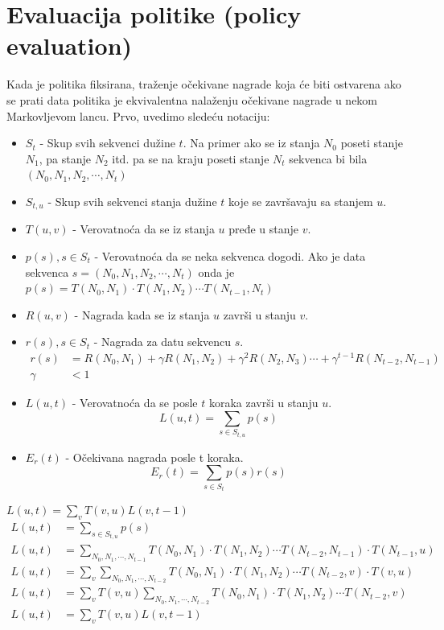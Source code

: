\documentclass[a4paper,fleqn,12pt]{JMThesis}
\newcommand{\latin}{\fontencoding{T1}\selectfont\selectlanguage{english}}
\theoremstyle{plain}
\theoremstyle{definition}
\theoremstyle{definition}
\begin{document}
\section{Evaluacija politike ({\latin policy evaluation})}
Kada je politika fiksirana, traženje očekivane nagrade koja će biti ostvarena ako se prati data politika je ekvivalentna nalaženju očekivane nagrade u nekom Markovljevom lancu. Prvo, uvedimo sledeću notaciju:
\begin{itemize}
	\item $S_t$ - Skup svih sekvenci dužine $t$. Na primer ako se iz stanja $N_0$ poseti stanje $N_1$, pa stanje $N_2$ itd. pa se na kraju poseti stanje $N_t$ sekvenca bi bila $(N_0, N_1, N_2, \cdots , N_t)$
 	\item $S_{t,u}$ - Skup svih sekvenci stanja dužine $t$ koje se završavaju sa stanjem $u$.
  	\item $T(u,v)$ - Verovatnoća da se iz stanja $u$ pređe u stanje $v$.
   	\item $p(s), s \in S_t$ - Verovatnoća da se neka sekvenca dogodi. Ako je data sekvenca $s=(N_0,N_1,N_2,\cdots , N_t)$ onda je $p(s) = T(N_0, N_1)\cdot T(N_1,N_2)\cdots T(N_{t-1},N_{t})$
    \item $R(u,v)$ - Nagrada kada se iz stanja $u$ završi u stanju $v$.
    \item $r(s), s \in S_t$ - Nagrada za datu sekvencu $s$. 
    \[ 
		\begin{split}
		r(s) &= R(N_0, N_1)+\gamma R(N_1,N_2) +\gamma^2 R(N_2,N_3) \cdots + \gamma^{t-1} R(N_{t-2},N_{t-1}) \\
		\gamma &< 1
		\end{split}
	\]
    \item $L(u,t)$ - Verovatnoća da se posle $t$ koraka završi u stanju $u$. 
	\[ 
		L(u,t) = \sum_{s \in S_{t,u}}p(s)
	\]
    \item $E_r(t)$ - Očekivana nagrada posle t koraka.
    \[
		E_r(t) = \sum_{s \in S_t}p(s)r(s)
	\]
\end{itemize}
\lem $L(u,t) = \sum_{v}T(v,u)L(v,t-1)$
\[
\begin{split}
	L(u,t) &= \sum_{s \in S_{t,u}}p(s)	\\
	L(u,t) &= \sum_{N_0, N_1, \cdots, N_{t-1}}T(N_0,N_1)\cdot T(N_1,N_2)\cdots T(N_{t-2},N_{t-1})\cdot T(N_{t-1},u)\\
	L(u,t) &= \sum_{v}\sum_{N_0, N_1,\cdots , N_{t-2}}T(N_0,N_1)\cdot T(N_1,N_2)\cdots T(N_{t-2},v) \cdot T(v,u)\\
	L(u,t) &= \sum_{v}T(v,u)\sum_{N_0, N_1,\cdots , N_{t-2}}T(N_0,N_1)\cdot T(N_1,N_2)\cdots T(N_{t-2},v)\\
	L(u,t) &= \sum_{v}T(v,u)L(v,t-1)
\end{split}
\]
\end{document}
